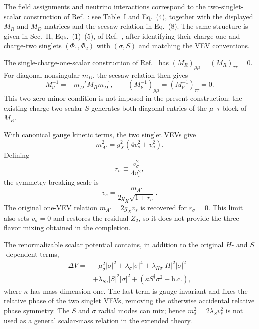 \documentclass[12pt,a4paper]{article}
\begin{document}
The field assignments and neutrino interactions correspond to the two-singlet-scalar construction of Ref.~\cite{Borah:2021twoSingletSeesaw}: see Table~I and Eq.~(4), together with the displayed \(M_R\) and \(M_D\) matrices and the seesaw relation in Eq.~(8). The same structure is given in Sec.~II, Eqs.~(1)--(5), of Ref.~\cite{He:2024twoSingletHNL}, after identifying their charge-one and charge-two singlets \((\Phi_1,\Phi_2)\) with \((\sigma,S)\) and matching the VEV conventions.

The single-charge-one-scalar construction of Ref.~\cite{Asai:2017ryy} has \((M_R)_{\mu\mu}=(M_R)_{\tau\tau}=0\). For diagonal nonsingular \(m_D\), the seesaw relation then gives
\[
M_\nu^{-1}=-m_D^{-T}M_Rm_D^{-1},\qquad
(M_\nu^{-1})_{\mu\mu}=(M_\nu^{-1})_{\tau\tau}=0.
\]
This two-zero-minor condition is not imposed in the present construction: the existing charge-two scalar \(S\) generates both diagonal entries of the \(\mu\)--\(\tau\) block of \(M_R\).

With canonical gauge kinetic terms, the two singlet VEVs give
\begin{equation}\label{eq:reply-neutrino-gauge-mass}
m_{A'}^2=g_X^2(4v_s^2+v_\sigma^2).
\end{equation}
Defining
\[
r_\sigma\equiv\frac{v_\sigma^2}{4v_s^2},
\]
the symmetry-breaking scale is
\[
v_s=\frac{m_{A'}}{2g_X\sqrt{1+r_\sigma}}.
\]
The original one-VEV relation \(m_{A'}=2g_Xv_s\) is recovered for \(r_\sigma=0\). This limit also sets \(v_\sigma=0\) and restores the residual \(Z_2\), so it does not provide the three-flavor mixing obtained in the completion.

The renormalizable scalar potential contains, in addition to the original \(H\)- and \(S\)-dependent terms,
\[
\begin{aligned}
\Delta V={}&-\mu_\sigma^2|\sigma|^2
+\lambda_\sigma|\sigma|^4
+\lambda_{H\sigma}|H|^2|\sigma|^2\\
&+\lambda_{S\sigma}|S|^2|\sigma|^2
+\left(\kappa S^\dagger\sigma^2+\mathrm{h.c.}\right),
\end{aligned}
\]
where \(\kappa\) has mass dimension one. The last term is gauge invariant and fixes the relative phase of the two singlet VEVs, removing the otherwise accidental relative phase symmetry. The \(S\) and \(\sigma\) radial modes can mix; hence \(m_s^2=2\lambda_Sv_s^2\) is not used as a general scalar-mass relation in the extended theory.
\end{document}

